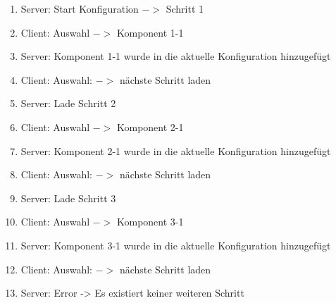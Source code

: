 \documentclass{article}
\begin{document}
\begin{enumerate}
  \item Server: Start Konfiguration $->$ Schritt 1
  \item Client: Auswahl $->$ Komponent 1-1
  \item Server: Komponent 1-1 wurde in die aktuelle Konfiguration hinzugef\"ugt
  \item Client: Auswahl: $->$ n\"achste Schritt laden
  \item Server: Lade Schritt 2
  \item Client: Auswahl $->$ Komponent 2-1
  \item Server: Komponent 2-1 wurde in die aktuelle Konfiguration hinzugef\"ugt
  \item Client: Auswahl: $->$ n\"achste Schritt laden
  \item Server: Lade Schritt 3
  \item Client: Auswahl $->$ Komponent 3-1
  \item Server: Komponent 3-1 wurde in die aktuelle Konfiguration hinzugef\"ugt
  \item Client: Auswahl: $->$ n\"achste Schritt laden
  \item Server: Error -> Es existiert keiner weiteren Schritt
\end{enumerate}
\end{document}
